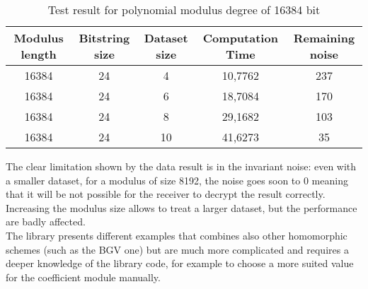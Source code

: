 \documentclass[12pt]{extarticle}
\begin{document}
\begin{table}[h]
	\begin{tabular}{||c|c|c|c|c||}
		\hline
		Modulus length & Bitstring size	& Dataset size	& Computation Time	& Remaining noise\\
		\hline\hline
		16384 & 24 & 4 & 10,7762 & 237\\
		\hline
		16384 & 24 & 6 & 18,7084 & 170 \\
		\hline
		16384 & 24 & 8 & 29,1682 & 103 \\
		\hline
		16384 & 24 & 10 & 41,6273 & 35 \\
		\hline
	\end{tabular}
\caption{Test result for polynomial modulus degree of 16384 bit}
\end{table}
The clear limitation shown by the data result is in the invariant noise: even with a smaller dataset, for a modulus of size 8192, the noise goes soon to 0 meaning that it will be not possible for the receiver to decrypt the result correctly.\\Increasing the modulus size allows to treat a larger dataset, but the performance are badly affected.\\The library presents different examples that combines also other homomorphic schemes (such as the BGV one) but are much more complicated and requires a deeper knowledge of the library code, for example to choose a more suited value for the coefficient module manually.
\end{document}
